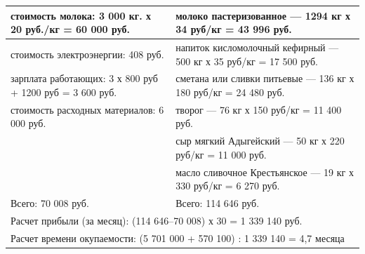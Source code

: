 \begin{table}[]
\begin{tabularx}{\textwidth}{|p{8.05cm}|p{8.05cm}|}
		стоимость молока: 3 000 кг. х 20 руб./кг =  60 000 руб.                 & молоко пастеризованное — 1294 кг х 34 руб/кг = 43 996 руб.          \\ \hline
		стоимость электроэнергии: 408 руб.                                      & напиток кисломолочный кефирный — 500 кг х 35 руб/кг = 17 500 руб.   \\ \hline
		зарплата работающих: 3 х 800 руб + 1200 руб = 3 600 руб.                & сметана или сливки питьевые — 136 кг х 180 руб/кг = 24 480 руб.     \\ \hline
		стоимость расходных материалов: 6 000 руб.                              & творог — 76 кг х 150 руб/кг = 11 400 руб.                           \\ \hline
																				& сыр мягкий Адыгейский — 50 кг х 220 руб/кг = 11 000 руб.            \\ \cline{2-2}
																				& масло сливочное Крестьянское — 19 кг х 330 руб/кг = 6 270 руб.      \\ \hline
		Всего:  70 008 руб.                                                     & Всего: 114 646 руб.                                                 \\ \hline
		\multicolumn{2}{|l|}{Расчет прибыли (за месяц): (114 646–70 008) х 30 = 1 339 140 руб.}                                                       \\ \hline
		\multicolumn{2}{|l|}{Расчет времени окупаемости:  (5 701 000 + 570 100) : 1 339 140 = 4,7 месяца}                                             \\ \hline
	\end{tabularx}
\end{table}































